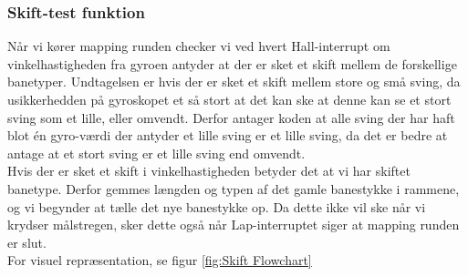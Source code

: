 \subsubsection{Skift-test funktion}

Når vi kører mapping runden checker vi ved hvert Hall-interrupt om vinkelhastigheden fra gyroen antyder at der er sket et skift mellem de forskellige banetyper. Undtagelsen er hvis der er sket et skift mellem store og små sving, da usikkerhedden på gyroskopet et så stort at det kan ske at denne kan se et stort sving som et lille, eller omvendt. Derfor antager koden at alle sving der har haft blot én gyro-værdi der antyder et lille sving er et lille sving, da det er bedre at antage at et stort sving er et lille sving end omvendt. 
\\
Hvis der er sket et skift i vinkelhastigheden betyder det at vi har skiftet banetype. Derfor gemmes længden og typen af det gamle banestykke i rammene, og vi begynder at tælle det nye banestykke op. Da dette ikke vil ske når vi krydser målstregen, sker dette også når Lap-interruptet siger at mapping runden er slut.
\\
For visuel repræsentation, se figur \ref{fig:Skift Flowchart}

